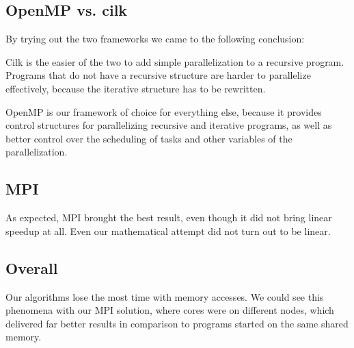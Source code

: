 \subsection{OpenMP vs. cilk}
By trying out the two frameworks we came to the following conclusion:

Cilk is the easier of the two to add simple parallelization to a recursive program. Programs that do not have a recursive structure are harder to parallelize effectively, because the iterative structure has to be rewritten. 

OpenMP is our framework of choice for everything else, because it provides control structures for parallelizing recursive and iterative programs, as well as better control over the scheduling of tasks and other variables of the parallelization.
\subsection{MPI}
As expected, MPI brought the best result, even though it did not bring linear speedup at all. Even our mathematical attempt did not turn out to be linear.

\subsection{Overall}
Our algorithms lose the most time with memory accesses. We could see this phenomena with our MPI solution, where cores were on different nodes, which delivered far better results in comparison to programs started on the same shared memory.  